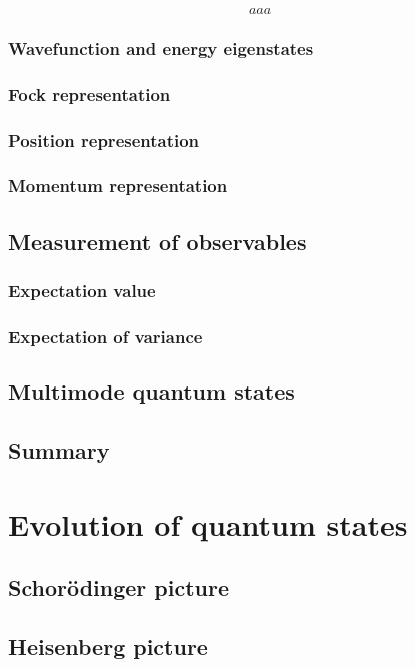 \documentclass{book}
\begin{document}
\begin{equation}
  aaa
\end{equation}





\subsection{Wavefunction and energy eigenstates}
\subsection{Fock representation}
\subsection{Position representation}
\subsection{Momentum representation}
\section{Measurement of observables}
\subsection{Expectation value}
\subsection{Expectation of variance}
\section{Multimode quantum states}
\section{Summary}

\chapter{Evolution of quantum states}
\section{Schor\"odinger picture}
\section{Heisenberg picture}
\end{document}
